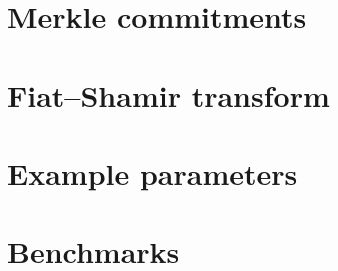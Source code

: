 
\section{Merkle commitments \tbc}
\label{s:STARK:Merkle}



\section{Fiat--Shamir transform \tbc}
\label{s:STARK:FiatShamir}



\section{Example parameters \tbc}
\label{s:STARK:params}



\section{Benchmarks \tbc}
\label{s:STARK:benchmarks}